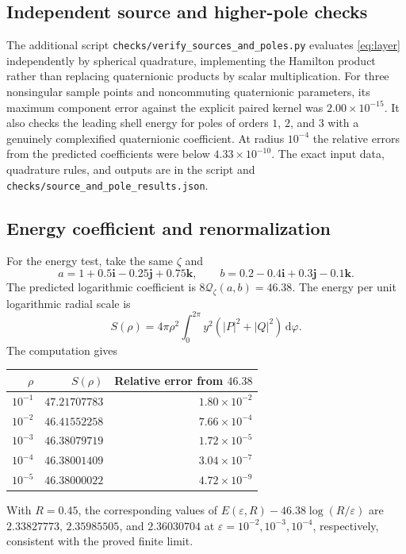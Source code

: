 \documentclass[11pt,a4paper]{article}
\numberwithin{equation}{section}
\theoremstyle{definition}
\theoremstyle{remark}
\newcommand{\dd}{\,\mathrm d}
\newcommand{\qf}{\mathcal Q}
\newcommand{\ii}{\mathbf i}
\newcommand{\jj}{\mathbf j}
\newcommand{\kk}{\mathbf k}
\begin{document}
\subsection{Independent source and higher-pole checks}
The additional script \texttt{checks/verify\_sources\_and\_poles.py} evaluates
\eqref{eq:layer} independently by spherical quadrature, implementing the
Hamilton product rather than replacing quaternionic products by scalar
multiplication. For three nonsingular sample points and noncommuting
quaternionic parameters, its maximum component error against the explicit
paired kernel was $2.00\times10^{-15}$. It also checks the leading shell
energy for poles of orders $1$, $2$, and $3$ with a genuinely
complexified quaternionic coefficient. At radius $10^{-4}$ the relative
errors from the predicted coefficients were below $4.33\times10^{-10}$.
The exact input data, quadrature rules, and outputs are in the script and
\texttt{checks/source\_and\_pole\_results.json}.

\subsection{Energy coefficient and renormalization}
For the energy test, take the same $\zeta$ and
\[
 a=1+0.5\ii-0.25\jj+0.75\kk,\qquad
 b=0.2-0.4\ii+0.3\jj-0.1\kk.
\]
The predicted logarithmic coefficient is $8\qf_\zeta(a,b)=46.38$.
The energy per unit logarithmic radial scale is
\[
 S(\rho)=4\pi\rho^2\int_0^{2\pi}
 y^2(|P|^2+|Q|^2)\dd\varphi.
\]
The computation gives
\begin{center}
\begin{tabular}{@{}rrr@{}}
\toprule
$\rho$ & $S(\rho)$ & Relative error from $46.38$\\
\midrule
$10^{-1}$ & $47.21707783$ & $1.80\times10^{-2}$\\
$10^{-2}$ & $46.41552258$ & $7.66\times10^{-4}$\\
$10^{-3}$ & $46.38079719$ & $1.72\times10^{-5}$\\
$10^{-4}$ & $46.38001409$ & $3.04\times10^{-7}$\\
$10^{-5}$ & $46.38000022$ & $4.72\times10^{-9}$\\
\bottomrule
\end{tabular}
\end{center}
With $R=0.45$, the corresponding values of
$E(\varepsilon,R)-46.38\log(R/\varepsilon)$ are $2.33827773$,
$2.35985505$, and $2.36030704$ at
$\varepsilon=10^{-2},10^{-3},10^{-4}$, respectively, consistent with
the proved finite limit.
\end{document}
